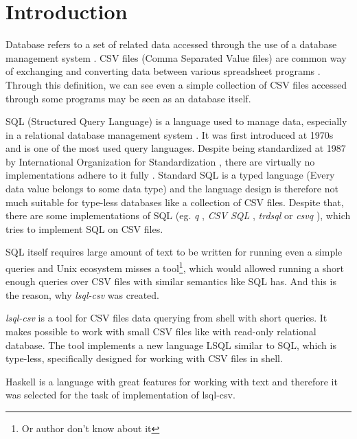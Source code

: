 \chapter*{Introduction}

Database refers to a set of related data accessed through the use of a database management system \cite{enwiki-database}.
CSV files (Comma Separated Value files) are common way of exchanging and converting data between various spreadsheet programs \cite{rfc4180}.
Through this definition, we can see even a simple collection of CSV files accessed through some programs may be seen as an database itself.


SQL (Structured Query Language) is a language used to manage data, especially in a relational database management system \cite{enwiki-sql}.
It was first introduced at 1970s \cite{enwiki-sql} and is one of the most used query languages. 
Despite being standardized at 1987 by International Organization for Standardization \cite{ISO9075-1987}, 
there are virtually no implementations adhere to it fully \cite{enwiki-sql}.
Standard SQL is a typed language (Every data value belongs to some data type) \cite{ISO9075-2023} and the language
design is therefore not much suitable for type-less databases like a collection of CSV files.
Despite that, there are some implementations of SQL (eg. \textit{q} \cite{q}, \textit{CSV SQL} \cite{csv-sql}, \textit{trdsql} \cite{trdsql} or \textit{csvq} \cite{csvq}), which tries to implement SQL on CSV files.

SQL itself requires large amount of text to be written for running even a simple queries and Unix ecosystem misses a tool\footnote{Or author don't know about it}, 
which would allowed running a short enough queries over CSV files with similar semantics like SQL has. And this is the reason, why \textit{lsql-csv} was created.

\textit{lsql-csv} is a tool for CSV files data querying from shell with short queries. It makes possible to work with small CSV files like with read-only relational database.
The tool implements a new language LSQL similar to SQL, which is type-less, specifically designed for working with CSV files in shell.

Haskell is a language with great features for working with text \cite{practical-haskell} and therefore it was selected for the task of implementation of lsql-csv.
